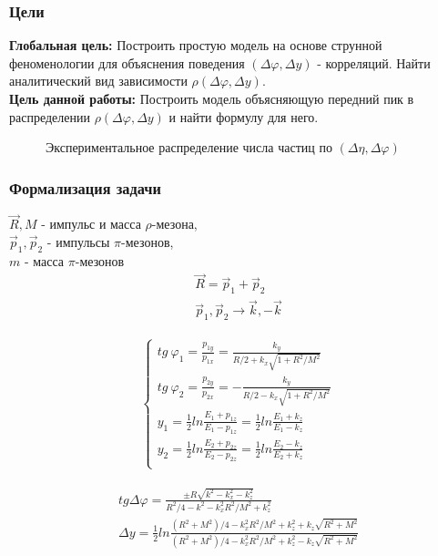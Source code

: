 \documentclass{beamer}
\renewcommand{\l}{\left( }
\renewcommand{\r}{\right) }
\renewcommand{\phi}{\varphi}
\newcommand{\br}[1]{\l {#1} \r}
\def\Dphi{\Delta\phi}
\def\Dy{\Delta y}
\def\kxx{k_x^2}
\def\kz{k_z}
\def\kzz{k_z^2}
\begin{document}
\begin{frame}[fragile]
    \frametitle{Цели}    
	\begin{minipage}[h]{0.45\linewidth}
		{\bf Глобальная цель: }
		Построить простую модель на основе струнной феноменологии для объяснения поведения $(\Dphi, \Dy)$ - корреляций. Найти аналитический вид зависимости $\rho(\Dphi, \Dy)$.
		\\
		{\bf Цель данной работы: }
		Построить модель объясняющую передний пик в  распределении $\rho(\Dphi, \Dy)$ и найти формулу для него.
	\end{minipage}
	\begin{minipage}[h]{0.53\linewidth}
		\begin{figure}
			\caption{Экспериментальное распределение числа частиц по $\br{\Delta \eta, \Delta \phi}$  }
		\end{figure}
	\end{minipage}
\end{frame}

\begin{frame}[fragile]
    \frametitle{Формализация задачи}    
		\begin{minipage}[h]{0.49\linewidth}
			$\vec R, M$ - импульс и масса $\rho$-мезона, \\
			$\vec p_1, \vec p_2$ - импульсы $\pi$-мезонов, \\
			$m$ - масса $\pi$-мезонов
			\begin{gather*}
				\vec R = \vec p_1 + \vec p_2 \\
				\vec p_1, \vec p_2 \rightarrow \vec k, -\vec k
			\end{gather*}
		\end{minipage}
		\begin{minipage}[h]{0.49\linewidth}
			\begin{gather*}
				\begin{cases}
					tg\ \phi_1 = \frac{p_{1y}}{p_{1x}} = \frac{k_y}{R / 2 +  k_x \sqrt{1 + R^2 / M^2}} \\
					tg\ \phi_2 = \frac{p_{2y}}{p_{2x}} = -\frac{k_y}{R / 2 -  k_x \sqrt{1 + R^2 / M^2}} \\
					y_1 = \frac{1}{2} ln \frac{E_1 + p_{1z}}{E_1 - p_{1z}} = \frac{1}{2} ln \frac{E_1 + k_z}{E_1 - k_z} \\
					y_2 = \frac{1}{2} ln \frac{E_2 + p_{2z}}{E_2 - p_{2z}} = \frac{1}{2} ln \frac{E_2 - k_z}{E_2 + k_z} \\
				\end{cases}
			\end{gather*}
		\end{minipage}
		\begin{gather*}
			tg \Dphi = \frac{\pm R\sqrt{k^2 - k_x^2 - k_z^2}}{R^2 / 4 - k^2 - k_x^2 R^2 / M^2 + k_z^2} \\
			\Dy = \frac{1}{2} ln \frac{(R^2 + M^2) / 4 - \kxx R^2 / M^2 + \kzz +\kz \sqrt{R^2 + M^2}}{(R^2 + M^2) / 4 - \kxx R^2 / M^2 + \kzz -\kz \sqrt{R^2 + M^2}}
		\end{gather*}
\end{frame}
\end{document}
